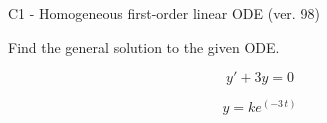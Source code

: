 \begin{exercise}
  \begin{exerciseTitle}C1 - Homogeneous first-order linear ODE (ver. 98)\end{exerciseTitle}
  \begin{exerciseStatement}
    
Find the general solution to the given ODE.

    
\[y'+3y=0\]

  \end{exerciseStatement}
  \begin{exerciseAnswer}
    
\[y= k e^{\left(-3 \, t\right)}\]

  \end{exerciseAnswer}
\end{exercise}